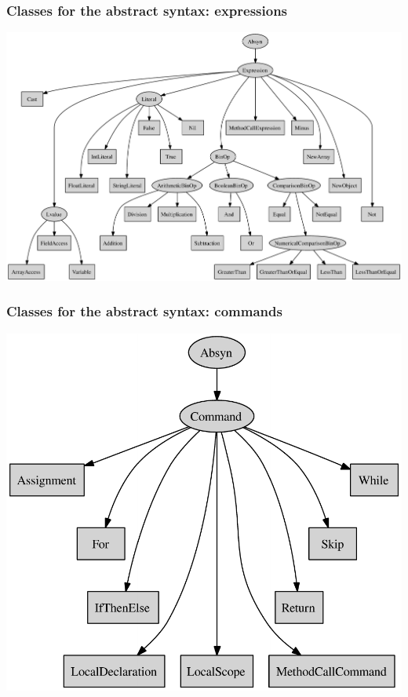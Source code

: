 \documentclass[11pt]{beamer}  %
\begin{document}
\begin{frame}[fragile]\frametitle{Classes for the abstract syntax: expressions}

\begin{center}
\includegraphics[scale=0.42]{pictures/expressions_hierarchy.pdf}
\end{center}

\end{frame}

\begin{frame}[fragile]\frametitle{Classes for the abstract syntax: commands}

\begin{center}
\includegraphics[scale=0.56]{pictures/commands_hierarchy.pdf}
\end{center}

\end{frame}
\end{document}
